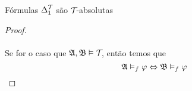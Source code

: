\begin{theorem}{Fórmulas $\Delta^{\mathcal{T}_{}}_{1}$ são $\mathcal{T}_{}$-absolutas}
\begin{proof}
                    \paragraph{}
                        Se for o caso que $\mathfrak{A},\mathfrak{B}\vDash\mathcal{T}_{}$, então temos que
                        $$\mathfrak{A}\vDash_f\varphi\Leftrightarrow\mathfrak{B}\vDash_f\varphi$$\eop
                \end{proof}
            \end{theorem}